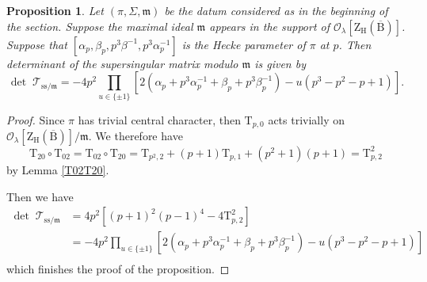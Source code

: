 \documentclass[10pt]{amsart}
\numberwithin{equation}{section}
\newtheorem{proposition}[equation]{Proposition}
\theoremstyle{definition}
\def\calO{\mathcal{O}}
\def\calT{\mathcal{T}}
\def\fracm{\mathfrak{m}}
\def\rmB{\mathrm{B}}
\def\rmH{\mathrm{H}}
\def\rmT{\mathrm{T}}
\def\rmZ{\mathrm{Z}}
\begin{document}
\begin{proposition}
Let $(\pi, \Sigma, \fracm)$ be the datum considered as in the beginning of the section. Suppose the maximal ideal $\fracm$ appears in the support of $\calO_{\lambda}[\rmZ_{\rmH}(\overline{\rmB})]$.  Suppose that $[\alpha_{p}, \beta_{p}, p^{3}\beta^{-1}, p^{3}\alpha^{-1}_{p}]$ is the Hecke parameter of $\pi$ at $p$. Then determinant of the supersingular matrix modulo $\fracm$ is given by
\begin{equation*}
\det\phantom{.}\calT_{\mathrm{ss}/\fracm}= -4p^{2}\prod_{u\in \{\pm 1\}}[2(\alpha_{p}+p^{3}\alpha^{-1}_{p}+\beta_{p}+p^{3}\beta^{-1}_{p})-u(p^{3}-p^{2}-p+1)].
\end{equation*}
\end{proposition}
\begin{proof}
Since $\pi$ has trivial central character, then $\rmT_{p,0}$ acts trivially on $\calO_{\lambda}[\rmZ_{\rmH}(\overline{\rmB})]/\fracm$. We therefore have 
\begin{equation*}
\rmT_{20}\circ\rmT_{02}= \rmT_{02}\circ\rmT_{20}=\rmT_{p^{2}, 2}+(p+1)\rmT_{p, 1}+(p^{2}+1)(p+1)=\rmT^{2}_{p,2}
\end{equation*}
by Lemma \ref{T02T20}. 

Then we have
\begin{equation*}
\begin{aligned}
\det\phantom{.}\calT_{\mathrm{ss}/\fracm}&=4p^{2}[(p+1)^{2}(p-1)^{4}-4\mathrm{T}^{2}_{p,2}]\\
&=-4p^{2}\prod_{u\in \{\pm 1\}}[2(\alpha_{p}+p^{3}\alpha^{-1}_{p}+\beta_{p}+p^{3}\beta^{-1}_{p})-u(p^{3}-p^{2}-p+1)]\\
\end{aligned}
\end{equation*}
which finishes the proof of the proposition.
\end{proof}
\end{document}
